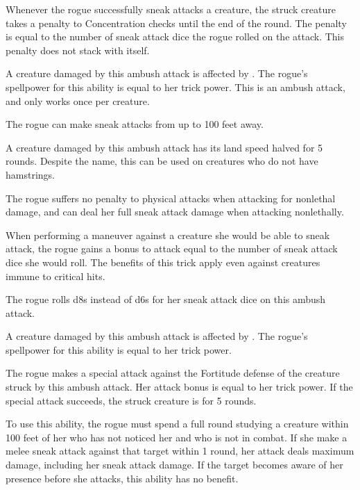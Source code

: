 Whenever the rogue successfully sneak attacks a creature, the struck creature takes a penalty to Concentration checks until the end of the round.
The penalty is equal to the number of sneak attack dice the rogue rolled on the attack.
This penalty does not stack with itself.

A creature damaged by this ambush attack is affected by .
The rogue's spellpower for this ability is equal to her trick power.
This is an ambush attack, and only works once per creature.

The rogue can make sneak attacks from up to 100 feet away.

A creature damaged by this ambush attack has its land speed halved for 5 rounds.
Despite the name, this can be used on creatures who do not have hamstrings.

The rogue suffers no penalty to physical attacks when attacking for nonlethal damage, and can deal her full sneak attack damage when attacking nonlethally.


When performing a maneuver against a creature she would be able to sneak attack, the rogue gains a bonus to attack equal to the number of sneak attack dice she would roll.
The benefits of this trick apply even against creatures immune to critical hits.

The rogue rolls d8s instead of d6s for her sneak attack dice on this ambush attack.

A creature damaged by this ambush attack is affected by .
The rogue's spellpower for this ability is equal to her trick power.

The rogue makes a special attack against the Fortitude defense of the creature struck by this ambush attack.
Her attack bonus is equal to her trick power.
If the special attack succeeds, the struck creature is \staggered for 5 rounds.

To use this ability, the rogue must spend a full round studying a creature within 100 feet of her who has not noticed her and who is not in combat.
If she make a melee sneak attack against that target within 1 round, her attack deals maximum damage, including her sneak attack damage.
If the target becomes aware of her presence before she attacks, this ability has no benefit.


